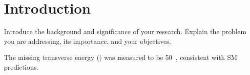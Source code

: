 \chapter{Introduction}

Introduce the background and significance of your research. Explain the problem you are addressing, its importance, and your objectives.

The missing transverse energy (\MET) was measured to be 50~\GeV, consistent with SM predictions.
